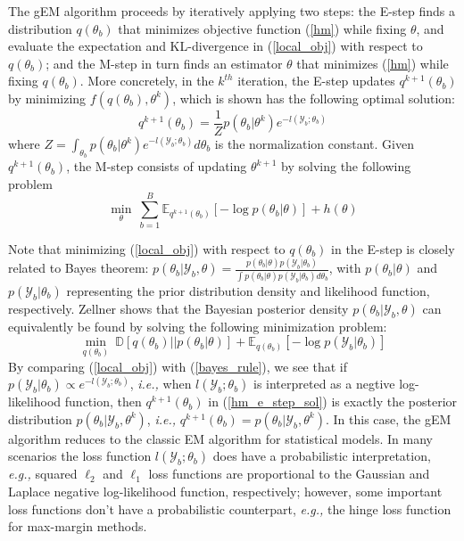 \documentclass{article}
\newcommand{\ie}[0]{\emph{i.e., }}
\newcommand{\eg}[0]{\emph{e.g., }}
\newcommand{\1}[0]{\ensuremath{\boldsymbol{1}}\xspace}
\begin{document}
The gEM algorithm proceeds by iteratively applying two steps: the E-step finds a distribution $q(\theta_b)$ that minimizes objective function (\ref{hm}) while fixing $\theta$, and evaluate the expectation and KL-divergence in (\ref{local_obj}) with respect to $q(\theta_b)$; and the M-step in turn finds an estimator $\theta$ that minimizes (\ref{hm}) while fixing $q(\theta_b)$. More concretely, in the $k^{th}$ iteration, the E-step updates $q^{k+1}(\theta_b)$ by minimizing $f(q(\theta_b), \theta^k)$, which is shown has the following optimal solution: 
\begin{equation}\label{hm_e_step_sol}
\textstyle q^{k+1}(\theta_b) = \frac{1}{Z}p(\theta_b|\theta^k)e^{-l(\mathcal{Y}_b; \theta_b)}
\end{equation}
where $Z = \int_{\theta_b}p(\theta_b|\theta^k)e^{-l(\mathcal{Y}_b; \theta_b)}d\theta_b$ is the normalization constant.  Given $q^{k+1}(\theta_b)$, the M-step consists of updating $\theta^{k+1}$ by solving the following problem
\begin{equation}\label{hm_m_step}
\textstyle\min_{\theta}~\sum_{b=1}^B\mathbb{E}_{q^{k+1}(\theta_b)}[-\log p(\theta_b|\theta)] + h(\theta)
\end{equation}

Note that minimizing (\ref{local_obj}) with respect to $q(\theta_b)$ in the E-step is closely related to Bayes theorem: $p(\theta_b|\mathcal{Y}_b, \theta) = \frac{p(\theta_b|\theta)p(\mathcal{Y}_b|\theta_b)}{\int p(\theta_b|\theta)p(\mathcal{Y}_b|\theta_b)d\theta_b}$, with $p(\theta_b|\theta)$ and $p(\mathcal{Y}_b|\theta_b)$ representing the prior distribution density and likelihood function, respectively. Zellner  shows that the Bayesian posterior density $p(\theta_b|\mathcal{Y}_b, \theta)$ can equivalently be found by solving the following minimization problem:
\begin{equation}\label{bayes_rule}
\textstyle \min_{q(\theta_b)} ~\mathbb{D}[q(\theta_b)||p(\theta_b|\theta)] + \mathbb{E}_{q(\theta_b)}[-\log p(\mathcal{Y}_b|\theta_b)]
\end{equation}
By comparing (\ref{local_obj}) with (\ref{bayes_rule}), we see that if $p(\mathcal{Y}_b|\theta_b) \propto e^{-l(\mathcal{Y}_b; \theta_b)}$, \ie when $l(\mathcal{Y}_b; \theta_b)$ is interpreted as a negtive log-likelihood function, then $q^{k+1}(\theta_b)$ in (\ref{hm_e_step_sol}) is exactly the posterior distribution $p(\theta_b|\mathcal{Y}_b, \theta^k)$, \ie $q^{k+1}(\theta_b) = p(\theta_b|\mathcal{Y}_b, \theta^k)$. In this case, the gEM algorithm reduces to the classic EM algorithm for statistical models. In many scenarios the loss function $l(\mathcal{Y}_b; \theta_b)$ does have a probabilistic interpretation, \eg  squared $\ell_2$ and $\ell_1$ loss functions are proportional to the  Gaussian and Laplace negative log-likelihood function, respectively; however, some important loss functions don't have a probabilistic counterpart, \eg the hinge loss function for max-margin methods.
\end{document}
